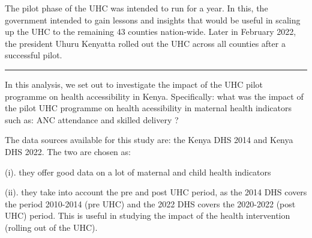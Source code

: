\documentclass[
  letterpaper,
  DIV=11,
  numbers=noendperiod,
  oneside]{scrartcl}
\begin{document}
The pilot phase of the UHC was intended to run for a year. In this, the
government intended to gain lessons and insights that would be useful in
scaling up the UHC to the remaining 43 counties nation-wide. Later in
February 2022, the president Uhuru Kenyatta rolled out the UHC across
all counties after a successful pilot.

\begin{center}\rule{0.5\linewidth}{0.5pt}\end{center}

In this analysis, we set out to investigate the impact of the UHC pilot
programme on health accessibility in Kenya. Specifically: what was the
impact of the pilot UHC programme on health acessibility in maternal
health indicators such as: ANC attendance and skilled delivery ?

The data sources available for this study are: the Kenya DHS 2014 and
Kenya DHS 2022. The two are chosen as:

(i). they offer good data on a lot of maternal and child health
indicators

(ii). they take into account the pre and post UHC period, as the 2014
DHS covers the period 2010-2014 (pre UHC) and the 2022 DHS covers the
2020-2022 (post UHC) period. This is useful in studying the impact of
the health intervention (rolling out of the UHC).
\end{document}
